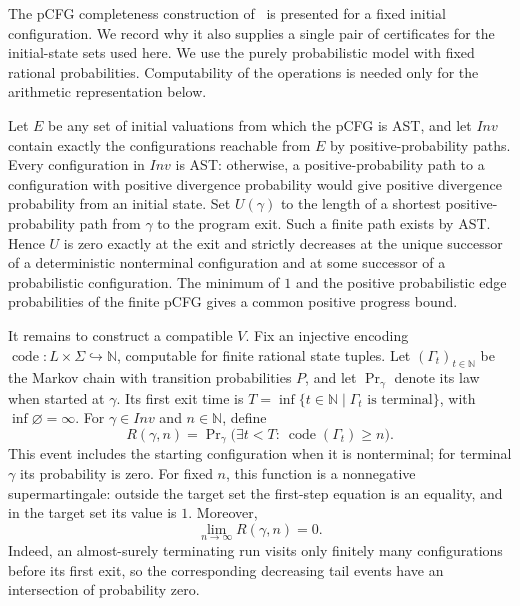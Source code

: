The pCFG completeness construction
of~\cite{DBLP:journals/pacmpl/MajumdarS25} is presented for a fixed initial
configuration. We record why it also supplies a single pair of
certificates for the initial-state sets used here. We use the purely probabilistic model with fixed rational probabilities.
Computability of the operations is needed only for the arithmetic
representation below.

Let $E$ be any set of initial valuations from which the pCFG is AST, and
let $\mathit{Inv}$ contain exactly the configurations reachable from $E$
by positive-probability paths. Every configuration in $\mathit{Inv}$ is
AST: otherwise, a positive-probability path to a configuration with
positive divergence probability would give positive divergence probability
from an initial state. Set $U(\gamma)$ to the length of a shortest
positive-probability path from $\gamma$ to the program exit. Such a finite
path exists by AST. Hence $U$ is zero exactly at the exit and strictly
decreases at the unique successor of a deterministic nonterminal
configuration and at some successor of a probabilistic configuration.
The minimum of $1$ and the positive probabilistic edge probabilities
of the finite pCFG gives a common positive progress bound.

It remains to construct a compatible $V$. Fix an injective encoding
$\operatorname{code}:L\times\Sigma\hookrightarrow\mathbb N$,
computable for finite rational state tuples. Let $(\Gamma_t)_{t\in\mathbb N}$
be the Markov chain with transition probabilities $P$, and let
$\Pr\nolimits_\gamma$ denote its law when started at $\gamma$.
Its first exit time is
$T=\inf\{t\in\mathbb N\mid\Gamma_t\text{ is terminal}\}$,
with $\inf\varnothing=\infty$. For $\gamma\in\mathit{Inv}$ and
$n\in\mathbb N$, define
\[
 R(\gamma,n)=\Pr\nolimits_\gamma
 \bigl(\exists t<T:\ \operatorname{code}(\Gamma_t)\geq n\bigr).
\]
This event includes the starting configuration when it is nonterminal;
for terminal $\gamma$ its probability is zero.
For fixed $n$, this function is a nonnegative supermartingale: outside
the target set the first-step equation is an equality, and in the target
set its value is $1$. Moreover,
\[
 \lim_{n\to\infty}R(\gamma,n)=0.
\]
Indeed, an almost-surely terminating run visits only finitely many
configurations before its first exit, so the corresponding decreasing
tail events have an intersection of probability zero.

